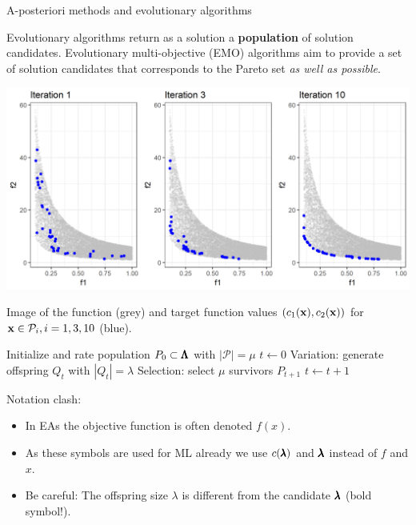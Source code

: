 \begin{frame}[allowframebreaks]{A-posteriori methods and evolutionary algorithms}

Evolutionary algorithms return as a solution a \textbf{population} of solution candidates. Evolutionary multi-objective (EMO) algorithms aim to provide a set of solution candidates that corresponds to the Pareto set \textit{as well as possible}.

\vspace*{-0.4cm}

\begin{center}
\includegraphics[width = 0.7\linewidth]{images/EA-steps.png}
\end{center}

\vspace*{-0.4cm}

\begin{footnotesize}
Image of the function (grey) and target function values $(c_1(\mathbf{x}), c_2(\mathbf{x}))$ for $\mathbf{x} \in \mathcal{P}_i, i = 1, 3, 10$ (blue).
\end{footnotesize}

\framebreak
\begin{algorithm}[H]
  \begin{center}
  \caption{Evolutionary algorithm}
      \begin{algorithmic}[1]
      \STATE Initialize and rate population $P_0 \subset \pmb{\Lambda}$ with $|\mathcal{P}| = \mu$ %
      \STATE $t \leftarrow 0$
      \REPEAT
        \STATE Variation: generate offspring $Q_t$ with $|Q_t| = \lambda$
        \STATE Selection: select $\mu$ survivors $P_{t + 1}$ %
 		\STATE $t \leftarrow t + 1$
     \end{algorithmic}
    \end{center}
\end{algorithm}


Notation clash:
\begin{itemize}
    \item In EAs the objective function is often denoted $f(x)$.
    \item As these symbols are used for ML already we use $c(\pmb{\lambda})$ and $\pmb{\lambda}$ instead of $f$ and $x$.
    \item Be careful: The offspring size $\lambda$ is different from the candidate $\pmb{\lambda}$ (bold symbol!).
\end{itemize}
\end{frame}


